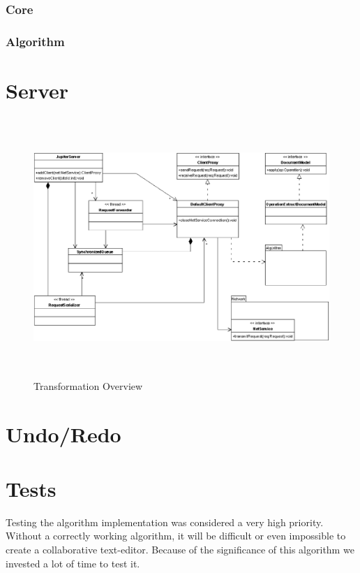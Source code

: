 \subsubsection{Core}

\subsubsection{Algorithm}

\section{Server}
\begin{figure}[H]
\centering
\includegraphics[height=9.8cm,width=15.36cm]{../../images/algo-impl/server_diagram.eps}
\caption{Transformation Overview}
\label{Transformation Overview}
\end{figure}


\section{Undo/Redo}



\section{Tests}
Testing the algorithm implementation was considered a very high priority. Without a correctly working algorithm, it will be difficult or even impossible to create a collaborative text-editor. Because of the significance of this algorithm we invested a lot of time to test it.

